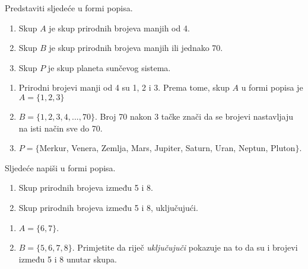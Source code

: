 \documentclass[a4paper, 14pt]{article}
\newcounter{counter}
\newcommand{\examplecounter}{\textbf{\refstepcounter{counter}PRIMJER \thecounter}}
\begin{document}
\begin{tcolorbox}[title=\large \examplecounter\hfill\small\textbf{"Skup u formi popisa"}]
Predstaviti sljedeće u formi popisa.\begin{enumerate}[label=\alph*),leftmargin=0.5cm]
\item Skup $A$ je skup prirodnih brojeva manjih od 4.
\item Skup $B$ je skup prirodnih brojeva manjih ili jednako 70.
\item Skup $P$ je skup planeta sunčevog sistema.
\end{enumerate}
\begin{tcolorbox}[title=\small \textbf{RJEŠENJE},colback=white]
\begin{center}
\begin{enumerate}[label=\alph*),leftmargin=0.5cm]
\item Prirodni brojevi manji od 4 su 1, 2 i 3. Prema tome, skup $A$ u formi popisa je $A=\{1,2,3\}$
\item $B=\{1, 2, 3, 4, ... , 70\}$. Broj 70 nakon 3 tačke znači da se brojevi nastavljaju na isti način sve do 70.
\item $P=\{$Merkur, Venera, Zemlja, Mars, Jupiter, Saturn, Uran, Neptun, Pluton$\}$.
\end{enumerate}
\end{center}
\end{tcolorbox}
\end{tcolorbox}

\begin{tcolorbox}[title=\large \examplecounter \hfill\small\textbf{"Riječ \textit{uključujući}"}]
Sljedeće napiši u formi popisa.
\begin{enumerate}[label=\alph*),leftmargin=0.5cm]
\item Skup prirodnih brojeva između 5 i 8.
\item Skup prirodnih brojeva između 5 i 8, uključujući.
\end{enumerate}
\begin{tcolorbox}[title=\small \textbf{RJEŠENJE},colback=white]
\begin{center}
\begin{enumerate}[label=\alph*),leftmargin=0.5cm]
\item $A=\{6, 7\}$.
\item $B=\{5, 6, 7, 8\}$. Primjetite da riječ \textit{uključujuči} pokazuje na to da su i brojevi između 5 i 8 unutar skupa.
\end{enumerate}
\end{center}
\end{tcolorbox}
\end{tcolorbox}
\end{document}
